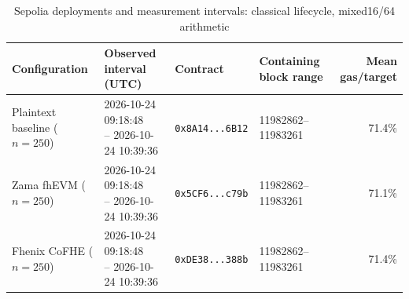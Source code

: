 \begin{table}[!t]
\caption{Sepolia deployments and measurement intervals: classical lifecycle, mixed16/64 arithmetic}
\label{tab:sepolia-experiment-deployments-reference-mixed-oct24}
\centering
\footnotesize
\setlength{\tabcolsep}{4pt}
\begin{tabular}{|l|l|l|l|r|}
\hline
\textbf{Configuration} &
\textbf{Observed interval (UTC)} &
\textbf{Contract} &
\textbf{Containing block range} &
\textbf{Mean gas/target} \\
\hline
Plaintext baseline (\(n=250\)) &
\shortstack[l]{2026-10-24 09:18:48 \\ -- 2026-10-24 10:39:36} &
\texttt{0x8A14...6B12} &
11982862--11983261 &
71.4\% \\
\hline
Zama fhEVM (\(n=250\)) &
\shortstack[l]{2026-10-24 09:18:48 \\ -- 2026-10-24 10:39:36} &
\texttt{0x5CF6...c79b} &
11982862--11983261 &
71.1\% \\
\hline
Fhenix CoFHE (\(n=250\)) &
\shortstack[l]{2026-10-24 09:18:48 \\ -- 2026-10-24 10:39:36} &
\texttt{0xDE38...388b} &
11982862--11983261 &
71.4\% \\
\hline
\end{tabular}
\end{table}
